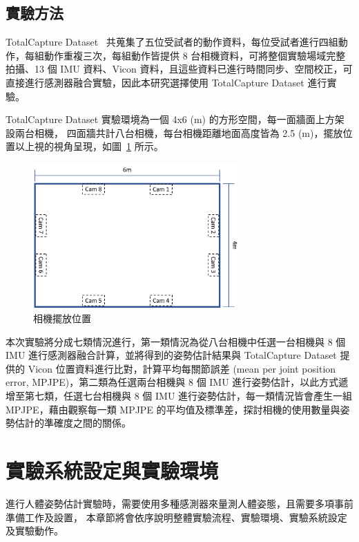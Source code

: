 \subsection{實驗方法}
TotalCapture Dataset~\cite{Trumble:BMVC:2017} 共蒐集了五位受試者的動作資料，每位受試者進行四組動作，每組動作重複三次，每組動作皆提供 8 台相機資料，可將整個實驗場域完整拍攝、13 個 IMU 資料、Vicon 資料，且這些資料已進行時間同步、空間校正，可直接進行感測器融合實驗，因此本研究選擇使用 TotalCapture Dataset 進行實驗。

TotalCapture Dataset 實驗環境為一個 4x6 (m) 的方形空間，每一面牆面上方架設兩台相機，
四面牆共計八台相機，每台相機距離地面高度皆為 2.5 (m)，擺放位置以上視的視角呈現，如圖~\ref{ch3_fig_cameraset_totalcap} 所示。

\begin{figure}[!ht]
   \centering
   \includegraphics[width=8cm]{figure/ch3_fig_cameraset_totalcap.png}
    \caption[相機擺放位置]{相機擺放位置}
    \label{ch3_fig_cameraset_totalcap}
\end{figure}

本次實驗將分成七類情況進行，第一類情況為從八台相機中任選一台相機與 8 個 IMU 進行感測器融合計算，並將得到的姿勢估計結果與 TotalCapture Dataset 提供的 Vicon 位置資料進行比對，計算平均每關節誤差 (mean per joint position error, MPJPE)，第二類為任選兩台相機與 8 個 IMU 進行姿勢估計，以此方式遞增至第七類，任選七台相機與 8 個 IMU 進行姿勢估計，每一類情況皆會產生一組 MPJPE，藉由觀察每一類 MPJPE 的平均值及標準差，探討相機的使用數量與姿勢估計的準確度之間的關係。

\section{實驗系統設定與實驗環境}\label{ch3_exp_setting}
進行人體姿勢估計實驗時，需要使用多種感測器來量測人體姿態，且需要多項事前準備工作及設置，
本章節將會依序說明整體實驗流程、實驗環境、實驗系統設定及實驗動作。

